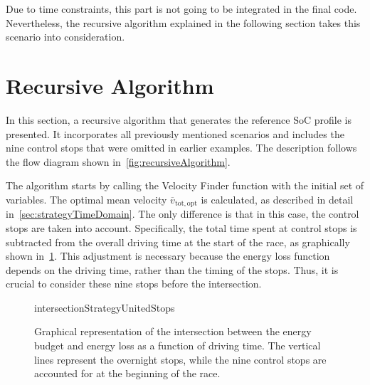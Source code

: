 Due to time constraints, this part is not going to be integrated in the final code. Nevertheless, the recursive algorithm explained in the following section takes this scenario into consideration.

\newpage
\section{Recursive Algorithm}
\label{sec:strategyRecursiveAlgo}
In this section, a recursive algorithm that generates the reference SoC profile is presented. It incorporates all previously mentioned scenarios and includes the nine control stops that were omitted in earlier examples. The description follows the flow diagram shown in~\cref{fig:recursiveAlgorithm}.

The algorithm starts by calling the Velocity Finder function with the initial set of variables. The optimal mean velocity $\overline{v}_\mathrm{tot,opt}$ is calculated, as described in detail in~\cref{sec:strategyTimeDomain}. The only difference is that in this case, the control stops are taken into account. Specifically, the total time spent at control stops is subtracted from the overall driving time at the start of the race, as graphically shown in~\cref{fig:strategyEintersectionUnitedStops}. This adjustment is necessary because the energy loss function depends on the driving time, rather than the timing of the stops. Thus, it is crucial to consider these nine stops before the intersection.
\begin{figure}[htbp]
	\centering
	\begin{externalize}{intersectionStrategyUnitedStops}
		
	\end{externalize}
	\caption{Graphical representation of the intersection between the energy budget and energy loss as a function of driving time. The vertical lines represent the overnight stops, while the nine control stops are accounted for at the beginning of the race.}
	\label{fig:strategyEintersectionUnitedStops}
\end{figure}

